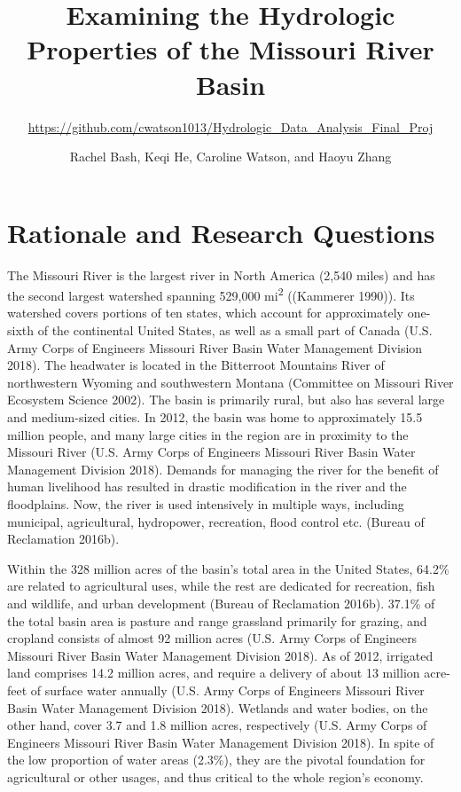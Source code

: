 \documentclass[12pt,]{article}
\title{Examining the Hydrologic Properties of the Missouri River Basin}
\subtitle{\url{https://github.com/cwatson1013/Hydrologic_Data_Analysis_Final_Proj}}
\author{Rachel Bash, Keqi He, Caroline Watson, and Haoyu Zhang}
\date{}
\begin{document}
\maketitle

\newpage

\hypertarget{rationale-and-research-questions}{%
\section{Rationale and Research
Questions}\label{rationale-and-research-questions}}

The Missouri River is the largest river in North America (2,540 miles)
and has the second largest watershed spanning 529,000
mi\textsuperscript{2} ((Kammerer 1990)). Its watershed covers portions
of ten states, which account for approximately one-sixth of the
continental United States, as well as a small part of Canada (U.S. Army
Corps of Engineers Missouri River Basin Water Management Division 2018).
The headwater is located in the Bitterroot Mountains River of
northwestern Wyoming and southwestern Montana (Committee on Missouri
River Ecosystem Science 2002). The basin is primarily rural, but also
has several large and medium-sized cities. In 2012, the basin was home
to approximately 15.5 million people, and many large cities in the
region are in proximity to the Missouri River (U.S. Army Corps of
Engineers Missouri River Basin Water Management Division 2018). Demands
for managing the river for the benefit of human livelihood has resulted
in drastic modification in the river and the floodplains. Now, the river
is used intensively in multiple ways, including municipal, agricultural,
hydropower, recreation, flood control etc. (Bureau of Reclamation
2016b).

Within the 328 million acres of the basin's total area in the United
States, 64.2\% are related to agricultural uses, while the rest are
dedicated for recreation, fish and wildlife, and urban development
(Bureau of Reclamation 2016b). 37.1\% of the total basin area is pasture
and range grassland primarily for grazing, and cropland consists of
almost 92 million acres (U.S. Army Corps of Engineers Missouri River
Basin Water Management Division 2018). As of 2012, irrigated land
comprises 14.2 million acres, and require a delivery of about 13 million
acre-feet of surface water annually (U.S. Army Corps of Engineers
Missouri River Basin Water Management Division 2018). Wetlands and water
bodies, on the other hand, cover 3.7 and 1.8 million acres, respectively
(U.S. Army Corps of Engineers Missouri River Basin Water Management
Division 2018). In spite of the low proportion of water areas (2.3\%),
they are the pivotal foundation for agricultural or other usages, and
thus critical to the whole region's economy.
\end{document}
